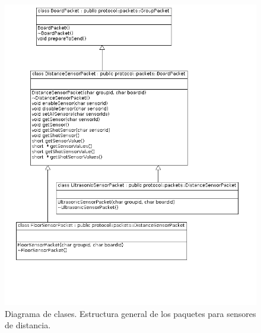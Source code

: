 \begin{figure}[ht]
	\centering
	\includegraphics[scale=0.52]{comportamientos/figures/cs3.png}
	\caption[Diagrama de clases: Estructura paquetes 2]{Diagrama de clases. Estructura general de los paquetes para sensores de distancia.}
	\label{fig:packet_specific_2}
\end{figure}

